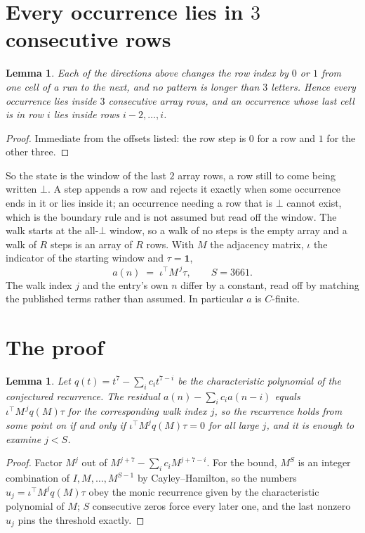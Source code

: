 \documentclass[11pt,a4paper]{article}
\theoremstyle{plain}
\newtheorem{lemma}[theorem]{Lemma}
\theoremstyle{definition}
\begin{document}
\section{Every occurrence lies in $3$ consecutive rows}

\begin{lemma}\label{lem:win}
Each of the directions above changes the row index by $0$ or $1$ from one cell of a run to the
next, and no pattern is longer than $3$ letters. Hence every occurrence lies inside $3$
consecutive array rows, and an occurrence whose last cell is in row $i$ lies inside rows
$i-2,\dots,i$.
\end{lemma}

\begin{proof}
Immediate from the offsets listed: the row step is $0$ for a row and $1$ for the other three.
\end{proof}

So the state is the window of the last $2$ array rows, a row still to come being written
$\bot$. A step appends a row and rejects it exactly when some occurrence ends in it or lies
inside it; an occurrence needing a row that is $\bot$ cannot exist, which is the boundary rule
and is not assumed but read off the window. The walk starts at the all-$\bot$ window, so a walk
of no steps is the empty array and a walk of $R$ steps is an array of $R$ rows. With $M$ the
adjacency matrix, $\iota$ the indicator of the starting window and $\tau=\mathbf{1}$,
\[
a(n)\;=\;\iota^{\!\top}M^{\,j}\tau ,\qquad S=3661.
\]
The walk index $j$ and the entry's own $n$ differ by a constant, read off by matching the
published terms rather than assumed. In particular $a$ is $C$-finite.

\section{The proof}

\begin{lemma}\label{lem:crit}
Let $q(t)=t^{7}-\sum_i c_it^{7-i}$ be the characteristic polynomial of the
conjectured recurrence. The residual $a(n)-\sum_ic_ia(n-i)$ equals
$\iota^{\!\top}M^{\,j}q(M)\tau$ for the corresponding walk index $j$, so the recurrence
holds from some point on if and only if $\iota^{\!\top}M^{j}q(M)\tau=0$ for all large $j$,
and it is enough to examine $j<S$.
\end{lemma}

\begin{proof}
Factor $M^{j}$ out of $M^{j+7}-\sum_ic_iM^{j+7-i}$. For the bound, $M^{S}$
is an integer combination of $I,M,\dots,M^{S-1}$ by Cayley--Hamilton, so the numbers
$u_j=\iota^{\!\top}M^{j}q(M)\tau$ obey the monic recurrence given by the characteristic
polynomial of $M$; $S$ consecutive zeros force every later one, and the last nonzero $u_j$
pins the threshold exactly.
\end{proof}
\end{document}
